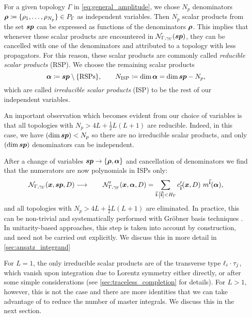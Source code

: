 For a given topology $\Gamma$ in \cref{eq:general_amplitude}, we chose $N_p$ denominators $\vb*{\rho}\coloneqq\{\rho_1,\ldots,\rho_{N_p}\} \in P_\Gamma$ as
independent variables. Then $N_p$ scalar products from the set $\vb*{sp}$
can be expressed as functions of the denominators $\vb*{\rho}$.
This implies
that whenever these scalar products are encountered in $\mathcal{N}_{\Gamma,\gamma_\Gamma}\qty(\vb*{sp})$, they can be cancelled with
one of the denominators and attributed to a topology with less propagators.
For this reason, these scalar products are commonly called \emph{reducible scalar products} (RSP).
We choose the remaining scalar products
\begin{equation}
  \vb*{\alpha} \coloneqq \vb*{sp} \setminus \{\text{RSPs}\} , \qquad N_\text{ISP} \coloneqq \dim{\vb*{\alpha}}   =  \dim{\vb*{sp}}-N_p,
\end{equation}
which are called
\emph{irreducible scalar products} (ISP) to be the rest of our independent variables.

An important observation which becomes evident from our choice of variables is that all topologies with $N_p> 4 L +\frac{1}{2}L(L+1)$ are reducible.
Indeed, in this case, we have $(\dim\vb*{sp}) < N_p$ so there are no irreducible scalar products, and only $(\dim\vb*{sp})$ denominators can be independent.


After a change of variables $\vb*{sp}\to \{\vb*{\rho},\vb*{\alpha}\}$ and cancellation of denominators
we find that the numerators are now polynomials in ISPs only:
\begin{equation} \label{eq:rsp_reduction}
  \mathcal{N}_{\Gamma,\gamma_\Gamma}(\vb*{x}, \vb*{sp}, D) \longrightarrow \qquad
    \mathcal{N}^{\prime}_{\Gamma,\gamma_\Gamma}(\vb*{x}, \vb*{\alpha}, D) =
    \sum_{\va{i} : \abs{\va{i}} < H_{\Gamma}} c^{\prime}_{\va{i}} (\vb*{x},D)~ m^{\va{i}}(\vb*{\alpha}),
\end{equation}
and all topologies with $N_p > 4L +\frac{1}{2}L(L+1)$ are eliminated.
In practice, this can be non-trivial and systematically performed with Gröbner basis techniques \cite{Zhang:2012ce,Mastrolia:2012wf,Mastrolia:2012an,Mastrolia:2016dhn}.
In unitarity-based approaches, this step is taken into account by construction,
and need not be carried out explicitly. We discuss this in more detail in \cref{sec:ansatz_integrand}

For $L=1$, the only irreducible scalar products are of the transverse type $\sp(\ell_i, \tau_j)$, which vanish upon integration due to Lorentz symmetry either directly,
or after some simple considerations (see \cref{sec:traceless_completion} for details).
For $L>1$, however, this is not the case and there are more identities that we can take advantage of to reduce the number of master integrals.
We discuss this in the next section.

